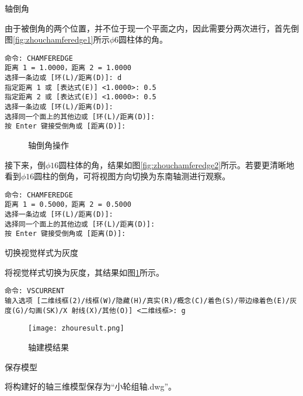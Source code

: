 \begin{procedure}
\item 轴倒角

由于被倒角的两个位置，并不位于现一个平面之内，因此需要分两次进行，首先倒图\ref{fig:zhouchamferedge1}所示$\phi 6$圆柱体的角。
\begin{lstlisting}
命令: CHAMFEREDGE
距离 1 = 1.0000，距离 2 = 1.0000
选择一条边或 [环(L)/距离(D)]: d
指定距离 1 或 [表达式(E)] <1.0000>: 0.5
指定距离 2 或 [表达式(E)] <1.0000>: 0.5
选择一条边或 [环(L)/距离(D)]:
选择同一个面上的其他边或 [环(L)/距离(D)]:
按 Enter 键接受倒角或 [距离(D)]:
\end{lstlisting}

\begin{figure}[htbp]
\centering
{}\hspace{20pt}
\caption{轴倒角操作}
\end{figure}

接下来，倒$\phi 16$圆柱体的角，结果如图\ref{fig:zhouchamferedge2}所示。若要更清晰地看到$\phi 16$圆柱的倒角，可将视图方向切换为东南轴测进行观察。

\begin{lstlisting}
命令: CHAMFEREDGE
距离 1 = 0.5000，距离 2 = 0.5000
选择一条边或 [环(L)/距离(D)]:
选择同一个面上的其他边或 [环(L)/距离(D)]:
按 Enter 键接受倒角或 [距离(D)]:
\end{lstlisting}

\item 切换视觉样式为灰度

将视觉样式切换为灰度，其结果如图\ref{fig:zhouresult}所示。
\begin{lstlisting}
命令: VSCURRENT
输入选项 [二维线框(2)/线框(W)/隐藏(H)/真实(R)/概念(C)/着色(S)/带边缘着色(E)/灰度(G)/勾画(SK)/X 射线(X)/其他(O)] <二维线框>: g
\end{lstlisting}
\begin{figure}[htbp]
\centering
\texttt{[image: zhouresult.png]}
\caption{轴建模结果}\label{fig:zhouresult}
\end{figure}
\item 保存模型

将构建好的轴三维模型保存为“小轮组轴.dwg”。
\end{procedure}

\endinput